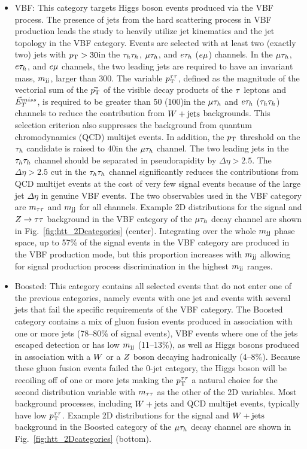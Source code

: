 \begin{itemize}
\item {VBF}: This category targets Higgs boson events produced via the VBF process.
The presence of jets from the hard scattering process in VBF production leads the study to heavily
utilize jet kinematics and the jet topology in the VBF category.
Events are selected with at least two (exactly two) jets with $p_\mathrm{T}>30$\GeV in the
$\tau_{h}\tau_{h}$, $\mu\tau_{h}$, and $e\tau_{h}$ ($e\mu$) channels.
In the $\mu\tau_{h}$, $e\tau_{h}$, and $e\mu$ channels, the two leading jets are required to have 
an invariant mass, $m_\mathrm{jj}$, larger than 300\GeV. The variable $p_\mathrm{T}^{\tau\tau}$, defined as the magnitude 
of the vectorial sum of the $\vec{p_\mathrm{T}}$ of the visible decay products of the $\tau$ leptons 
and $\vec{E}^{miss}_T$, is required to be greater than 50 (100)\GeV in the $\mu\tau_{h}$
 and $e\tau_{h}$ ($\tau_{h}\tau_{h}$) channels to reduce the contribution from $W+\text{jets}$ 
backgrounds. This selection criterion also suppresses the background from quantum 
chromodynamics (QCD) multijet events. In addition, the $p_\mathrm{T}$ threshold on the $\tau_{h}$ 
candidate is raised to 40\GeV in the $\mu\tau_{h}$ channel. The two leading jets in the 
$\tau_{h}\tau_{h}$ channel should be separated in pseudorapidity by $\Delta\eta>2.5$. The $\Delta\eta>2.5$
cut in the $\tau_{h}\tau_{h}$ channel significantly reduces the contributions from QCD multijet events at the cost
of very few signal events because of the large jet $\Delta\eta$ in genuine VBF events.
The two observables used in the VBF category are $m_{\tau\tau}$ and $m_\mathrm{jj}$ for all channels. Example 2D 
distributions for the signal and $Z\to\tau\tau$ background
in the VBF category of the $\mu\tau_{h}$ decay channel are shown in Fig.~\ref{fig:htt_2Dcategories} (center). 
Integrating over the whole $m_\mathrm{jj}$ phase space, up to 57\% of the signal events in the VBF 
category are produced in the VBF production mode, but this proportion increases with $m_\mathrm{jj}$ allowing
for signal production process discrimination in the highest $m_\mathrm{jj}$ ranges.

\item {Boosted}: This category contains all selected events that do not enter one of the previous 
categories, namely events with one jet and events with several jets that fail the specific requirements of the VBF category.
The Boosted category contains a mix of gluon fusion events produced in association with one or more jets (78--80\% of signal events),
VBF events where one of the jets escaped detection or has low $m_\mathrm{jj}$ (11--13\%), as well as
Higgs bosons produced in association with a $W$ or a $Z$ boson decaying hadronically (4--8\%).
Because these gluon fusion events failed the 0-jet category, the Higgs boson will be recoiling 
off of one or more jets making the $p_\mathrm{T}^{\tau\tau}$ a natural choice for the second distribution variable with
$m_{\tau\tau}$ as the other of the 2D variables. 
Most background processes, including $W+\text{jets}$ and QCD multijet events, typically have low $p_\mathrm{T}^{\tau\tau}$. 
Example 2D distributions for the signal and $W+\text{jets}$ background in the Boosted category of 
the $\mu\tau_{h}$ decay channel are shown in Fig.~\ref{fig:htt_2Dcategories} (bottom).
\end{itemize}

